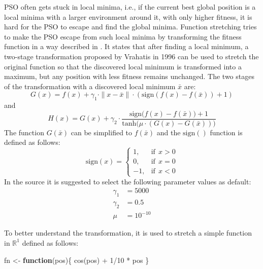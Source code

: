 \documentclass[
  oneside]{book}
\newenvironment{Shaded}{\begin{snugshade}}{\end{snugshade}}
\newcommand{\ControlFlowTok}[1]{\textcolor[rgb]{0.13,0.29,0.53}{\textbf{#1}}}
\newcommand{\DecValTok}[1]{\textcolor[rgb]{0.00,0.00,0.81}{#1}}
\newcommand{\FunctionTok}[1]{\textcolor[rgb]{0.00,0.00,0.00}{#1}}
\newcommand{\NormalTok}[1]{#1}
\newcommand{\OtherTok}[1]{\textcolor[rgb]{0.56,0.35,0.01}{#1}}
\newcommand{\SpecialCharTok}[1]{\textcolor[rgb]{0.00,0.00,0.00}{#1}}
\begin{document}
PSO often gets stuck in local minima, i.e., if the current best global position is a local minima with a larger environment around it, with only higher fitness, it is hard for the PSO to escape and find the global minima. Function stretching tries to make the PSO escape from such local minima by transforming the fitness function in a way described in \citep{PaVr2002}. It states that after finding a local minimum, a two-stage transformation proposed by Vrahatis in 1996 can be used to stretch the original function so that the discovered local minimum is transformed into a maximum, but any position with less fitness remains unchanged. The two stages of the transformation with a discovered local minimum \(\bar{x}\) are:
\[
  G(x) = f(x) +  \gamma_1 \cdot \| x-\bar{x} \| \cdot (\text{sign}(f(x)-f(\bar{x}))+1)
\]
and
\[
  H(x) = G(x) + \gamma_2 \cdot \frac{\text{sign}\biggl(f(x)-f(\bar{x})\biggr)+1}{\text{tanh}\biggl( \mu \cdot (G(x)-G(\bar{x})) \biggr)}
\]
The function \(G(\bar{x})\) can be simplified to \(f(\bar{x})\) and the \(\text{sign}()\) function is defined as follows:
\[
  \text{sign}(x) = 
  \begin{cases}
    1, & \text{if}\ \ x > 0\\
    0, & \text{if}\ \ x = 0\\
    -1, & \text{if}\ \ x < 0
  \end{cases}
\]
In the source it is suggested to select the following parameter values as default:
\begin{align*}
  \gamma_1 &= 5000 \\
  \gamma_2 &= 0.5 \\
  \mu &= 10^{-10}
\end{align*}

To better understand the transformation, it is used to stretch a simple function in \(\mathbb{R}^1\) defined as follows:

\begin{Shaded}
\begin{Highlighting}[]
\NormalTok{fn }\OtherTok{\textless{}{-}} \ControlFlowTok{function}\NormalTok{(pos)\{}
  \FunctionTok{cos}\NormalTok{(pos) }\SpecialCharTok{+} \DecValTok{1}\SpecialCharTok{/}\DecValTok{10} \SpecialCharTok{*}\NormalTok{ pos}
\NormalTok{\}}
\end{Highlighting}
\end{Shaded}
\end{document}
